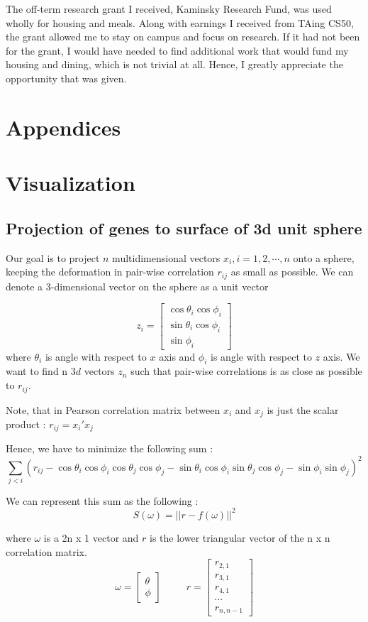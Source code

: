 \documentclass[]{article}
\begin{document}
The off-term research grant I received, Kaminsky Research Fund, was used wholly for housing and meals. Along with earnings I received from TAing CS50, the grant allowed me to stay on campus and focus on research. If it had not been for the grant, I would have needed to find additional work that would fund my housing and dining, which is not trivial at all. Hence, I greatly appreciate the opportunity that was given.


\bigskip \bigskip \bigskip \bigskip

\newpage
\appendix
\singlespacing
\section*{Appendices}
\section{Visualization}
\subsection{Projection of genes to surface of  3d unit sphere}
Our goal is to project $n$ multidimensional vectors ${x_i,i=1,2,\dotsb,n}$ onto a sphere, keeping the deformation in pair-wise correlation $r_{ij}$ as small as possible. We can denote a 3-dimensional vector on the sphere as a unit vector 

\[
z_i=\left[
\begin{array}{c}
\cos \theta_i \cos \phi_i\\
\sin \theta_i \cos \phi_i\\
\sin \phi_i
\end{array}
\right]
\]
where $\theta_i$ is angle with respect to $x$ axis and $\phi_i$ is angle with respect to $z$ axis. We want to find n $3d$ vectors $z_n$ such that pair-wise correlations is as close as possible to $r_{ij}.$

Note, that in Pearson correlation matrix between $x_i$ and $x_j$ is just the scalar product : $r_{ij}=x_i'x_j$

Hence, we have to minimize the following sum : 
$$\sum_{j<i}(r_{ij}-\cos \theta_i \cos \phi_i\cos \theta_j \cos \phi_j-\sin \theta_i \cos \phi_i\sin \theta_j \cos \phi_j-\sin \phi_i\sin \phi_j)^2 $$

We can represent this sum as the following : 
$$S(\omega) = || r- f(\omega)||^2$$

where $\omega$ is a 2n x 1 vector and $r$ is the lower triangular vector of the n x n correlation matrix.
\[\omega= \left[
\begin{array}{c}
\theta \\ \phi
\end{array}
\right] 
\hspace{30pt}
r=
\left[
\begin{array}{c}
r_{2,1}\\r_{3,1}\\r_{4,1}\\ \dotsb \\ r_{n,n-1}
\end{array}
\right]
\]
\end{document}
